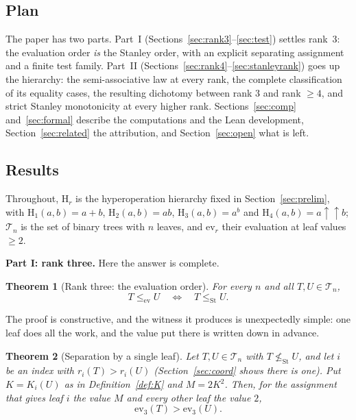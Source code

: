 \documentclass[11pt,a4paper]{article}
\theoremstyle{plain}
\newtheorem{theorem}{Theorem}[section]
\theoremstyle{definition}
\newcommand{\HH}{\mathrm{H}}
\newcommand{\tw}{\uparrow\uparrow}
\newcommand{\ev}{\mathrm{ev}}
\newcommand{\Tam}{\mathcal{T}}
\newcommand{\St}{\mathrm{St}}
\begin{document}
\subsection{Plan}

The paper has two parts. Part~I (Sections~\ref{sec:rank3}--\ref{sec:test}) settles
rank~$3$: the evaluation order \emph{is} the Stanley order, with an explicit separating
assignment and a finite test family. Part~II
(Sections~\ref{sec:rank4}--\ref{sec:stanleyrank}) goes up the hierarchy: the
semi-associative law at every rank, the complete classification of its equality cases,
the resulting dichotomy between rank $3$ and rank $\ge4$, and strict Stanley
monotonicity at every higher rank. Sections~\ref{sec:comp}
and~\ref{sec:formal} describe the computations and the Lean development,
Section~\ref{sec:related} the attribution, and Section~\ref{sec:open} what is left.

\subsection{Results}

Throughout, $\HH_r$ is the hyperoperation hierarchy fixed in
Section~\ref{sec:prelim}, with $\HH_1(a,b)=a+b$, $\HH_2(a,b)=ab$,
$\HH_3(a,b)=a^{b}$ and $\HH_4(a,b)=a\tw b$; $\Tam_n$ is the set of binary trees with
$n$ leaves, and $\ev_r$ their evaluation at leaf values $\ge2$.

\medskip
\noindent\textbf{Part I: rank three.} Here the answer is complete.

\begin{theorem}[Rank three: the evaluation order]\label{thm:main}
For every $n$ and all $T,U\in\Tam_n$,
\[
  T\le_{\ev}U\quad\Longleftrightarrow\quad T\le_{\St}U .
\]
\end{theorem}

The proof is constructive, and the witness it produces is unexpectedly simple: one leaf
does all the work, and the value put there is written down in advance.

\begin{theorem}[Separation by a single leaf]\label{thm:sep}
Let $T,U\in\Tam_n$ with $T\not\le_{\St}U$, and let $i$ be an index with
$r_i(T)>r_i(U)$ (Section~\ref{sec:coord} shows there is one). Put $K=K_i(U)$ as in
Definition~\ref{def:K} and $M=2K^2$. Then, for the assignment that gives leaf $i$ the
value $M$ and every other leaf the value $2$,
\[
  \ev_3(T)>\ev_3(U).
\]
\end{theorem}
\end{document}
